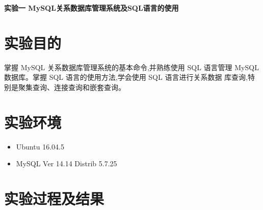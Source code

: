 \documentclass{ML}
\begin{document}
\maketitle

\newpage

\begin{center}
    \textbf{ 实验一 MySQL关系数据库管理系统及SQL语言的使用}
\end{center}

\section{实验目的}
    掌握 MySQL 关系数据库管理系统的基本命令,并熟练使用 SQL 语言管理
MySQL 数据库。掌握 SQL 语言的使用方法,学会使用 SQL 语言进行关系数据
库查询,特别是聚集查询、连接查询和嵌套查询。
\section{实验环境}
\begin{itemize}
    \item Ubuntu 16.04.5
    \item MySQL Ver 14.14 Distrib 5.7.25
\end{itemize}
\section{实验过程及结果}
\end{document}
